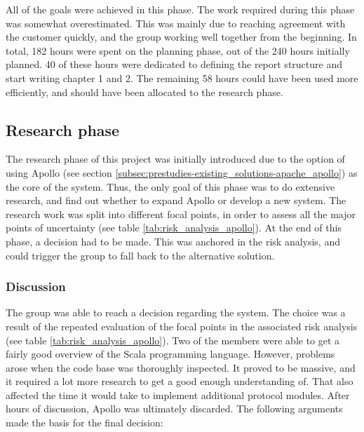 All of the goals were achieved in this phase. The work required during this phase was somewhat overestimated. This was mainly due to reaching agreement with the customer quickly, and the group working well together from the beginning. In total, 182 hours were spent on the planning phase, out of the 240 hours initially planned. 40 of these hours were dedicated to defining the report structure and start writing chapter 1 and 2. The remaining 58 hours could have been used more efficiently, and should have been allocated to the research phase.

\subsection{Research phase}
\label{subsec:project_lifecycle-planning_and_research-research_phase}

The research phase of this project was initially introduced due to the option of using Apollo (see section \ref{subsec:prestudies-existing_solutions-apache_apollo}) as the core of the system. Thus, the only goal of this phase was to do extensive research, and find out whether to expand Apollo or develop a new system. The research work was split into different focal points, in order to assess all the major points of uncertainty (see table \ref{tab:risk_analysis_apollo}). At the end of this phase, a decision had to be made. This was anchored in the risk analysis, and could trigger the group to fall back to the alternative solution.

\subsubsection{Discussion}
\label{subsec:project_lifecycle-planning_and_research-research_phase-discussion}

The group was able to reach a decision regarding the system. The choice was a result of the repeated evaluation of the focal points in the associated risk analysis (see table \ref{tab:risk_analysis_apollo}). Two of the members were able to get a fairly good overview of the Scala programming language. However, problems arose when the code base was thoroughly inspected. It proved to be massive, and it required a lot more research to get a good enough understanding of. That also affected the time it would take to implement additional protocol modules. After hours of discussion, Apollo was ultimately discarded. The following arguments made the basis for the final decision:


